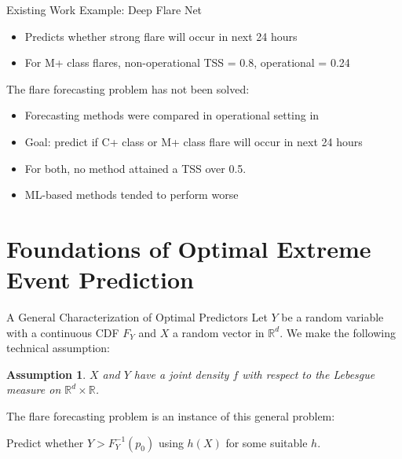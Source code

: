 \documentclass{beamer}
\newtheorem{assumption}{Assumption}[section]
\def\R{\mathbb R}
\begin{document}
\begin{frame}{Existing Work}
    Example: Deep Flare Net \cite{nishizuka2018deep, nishizuka2021oper}
    \begin{itemize}
        \item Predicts whether strong flare will occur in next 24 hours
        \item For M+ class flares, non-operational TSS = 0.8, operational = 0.24
    \end{itemize}    
    The flare forecasting problem has not been solved:
    \begin{itemize}
        \item Forecasting methods were compared in operational setting in \cite{leka2019acomII, leka2019acomIII}
        \item Goal: predict if C+ class or M+ class flare will occur in next 24 hours
        \item For both, no method attained a TSS over 0.5.
        \item ML-based methods tended to perform worse
    \end{itemize}
\end{frame}

\section{Foundations of Optimal Extreme Event Prediction}

\begin{frame}{A General Characterization of Optimal Predictors}
    Let $Y$ be a random variable with a continuous CDF $F_Y$ and $X$ a random vector in $\R^d$. We make the following technical assumption:
    \begin{assumption}\label{assump:joint_dens}
        $X$ and $Y$ have a joint density $f$ with respect to the Lebesgue measure on $\R^d \times \mathbb{R}$.
    \end{assumption}
    The flare forecasting problem is an instance of this general problem:
    \begin{center}
        Predict whether $Y > F_Y^{-1}(p_0)$ using $h(X)$ for some suitable $h$.
    \end{center}
\end{frame}
\end{document}
